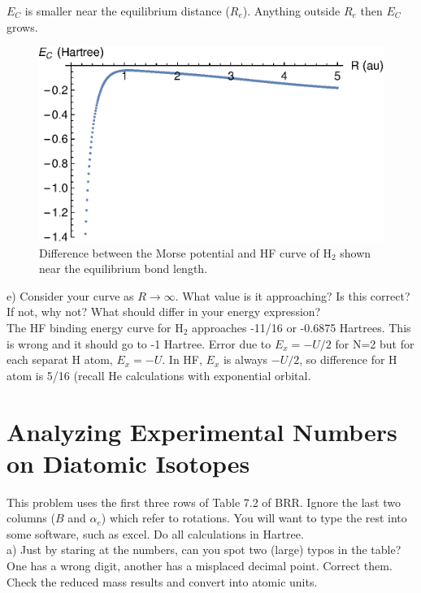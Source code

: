 \documentclass{article}
\begin{document}
{\color{blue}
  $E_C$ is smaller near the equilibrium distance ($R_e$). Anything outside $R_e$
  then $E_C$ grows.
}

\begin{figure}[H]
  \centering
  \includegraphics[scale=0.8]{diff_hfmorse.eps}
  \caption{Difference between the Morse potential and HF curve of H$_2$
    shown near the equilibrium bond length.}
\end{figure}

\noindent e) Consider your curve as $R\rightarrow\infty$. What value is it
approaching? Is this correct? If not, why not? What should differ in your energy
expression?
\\

{\color{blue}
  The HF binding energy curve for H$_2$ approaches -11/16 or -0.6875 Hartrees.
  This is wrong and it should go to -1 Hartree. Error due to $E_x = -U/2$ for
  N=2 but for each separat H atom, $E_x = - U$. In HF, $E_x$ is always $-U/2$,
  so difference for H atom is 5/16 (recall He calculations with exponential
  orbital.
}

\pagebreak

\section*{Analyzing Experimental Numbers on Diatomic Isotopes}

This problem uses the first three rows of Table 7.2 of BRR.  Ignore the last two columns
($B$ and $\alpha_e$) which refer to rotations.  You will want to type the rest into
some software, such as excel.  Do all calculations in Hartree.
\\

\noindent a) Just by staring at the numbers, can you spot two (large) typos in the table? One has a
wrong digit, another has a misplaced decimal point. Correct them. Check the reduced mass
results and convert into atomic units.
\\
\end{document}
